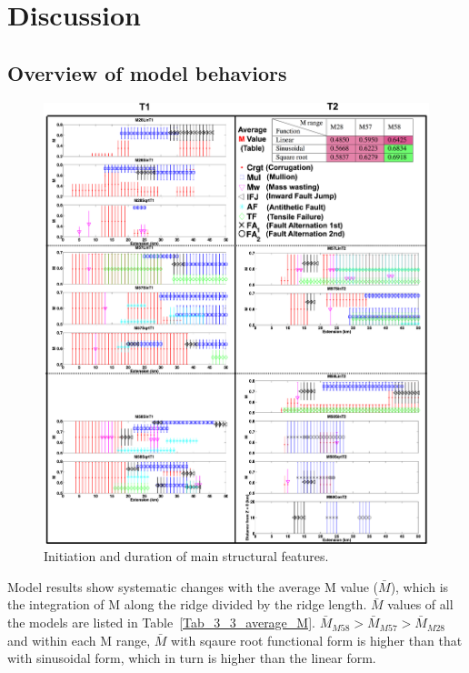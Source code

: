 \pagebreak
\section{Discussion}

\subsection{Overview of model behaviors}

\begin{figure}[h]
  \centering
    \includegraphics[width=1.0\textwidth]{./Figures/fig_Discussion_Result_Summary_1_Combine_together.eps}
    \caption{Initiation and duration of main structural features.}%
 \label{fig_Discussion_Result_Summary_1_Combine_together}
\end{figure} 

Model results show systematic changes with the average M value ($\bar{M}$), which is the integration of M along the ridge divided by the ridge length. $\bar{M}$ values of all the models are listed in Table~\hyperref[Tab_3_3_average_M]{\ref{Tab_3_3_average_M}}. $\bar{M}_{M58} > \bar{M}_{M57} > \bar{M}_{M28}$ and within each M range, $\bar{M}$ with sqaure root functional form is higher than that with sinusoidal form, which in turn is higher than the linear form.

